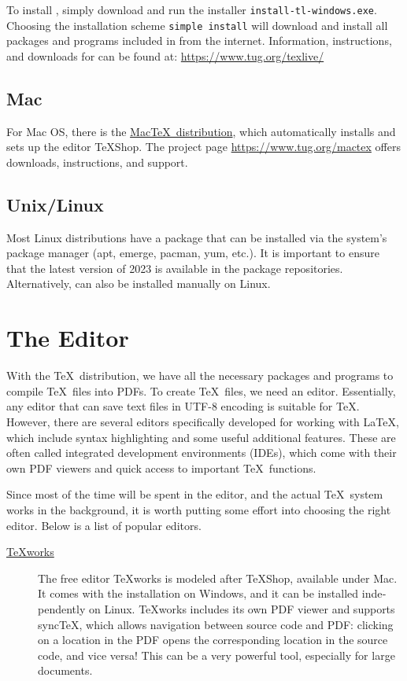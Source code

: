 \documentclass[
	ausgabe=2024-02-12,
	titel=Installation\ Instructions,
	shortverb=true,
	englisch=true,
]{../tex/latexkurs-exercise}
\begin{document}
\begin{english}
To install \TeXlive, simply download and run the installer \texttt{install-tl-windows.exe}. Choosing the installation scheme \texttt{simple install} will download and install all packages and programs included in \TeXlive from the internet. Information, instructions, and downloads for \TeXlive can be found at: \url{https://www.tug.org/texlive/}

\subsection*{Mac}
For Mac OS, there is the \href{https://www.tug.org/mactex}{Mac\TeX\ distribution}, which automatically installs \TeXlive and sets up the editor TeXShop. The project page \url{https://www.tug.org/mactex} offers downloads, instructions, and support.

\subsection*{Unix/Linux}
Most Linux distributions have a \TeXlive package that can be installed via the system's package manager (apt, emerge, pacman, yum, etc.). It is important to ensure that the latest version of 2023 is available in the package repositories. Alternatively, \TeXlive can also be installed manually on Linux.




\clearpage

\section{The Editor}

With the \TeX\ distribution, we have all the necessary packages and programs to compile \TeX\ files into PDFs. To create \TeX\ files, we need an editor. Essentially, any editor that can save text files in UTF-8 encoding is suitable for \TeX. However, there are several editors specifically developed for working with \LaTeX, which include syntax highlighting and some useful additional features. These are often called integrated development environments (IDEs), which come with their own PDF viewers and quick access to important \TeX\ functions.

Since most of the time will be spent in the editor, and the actual \TeX\ system works in the background, it is worth putting some effort into choosing the right editor. Below is a list of popular editors.

\begin{description}
\item[\href{https://www.tug.org/texworks/}{TeXworks}]
The free editor TeXworks is modeled after TeXShop, available under Mac. It comes with the \TeXlive installation on Windows, and it can be installed independently on Linux. TeXworks includes its own PDF viewer and supports sync\TeX, which allows navigation between source code and PDF: clicking on a location in the PDF opens the corresponding location in the source code, and vice versa! This can be a very powerful tool, especially for large documents.


\end{description}
\end{english}
\end{document}
